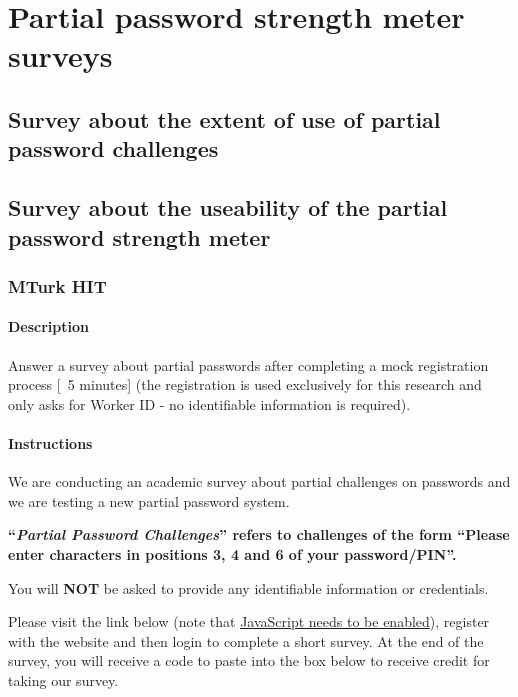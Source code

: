 
\chapter{Partial password strength meter surveys}
  \label{ap:Surveys}
  \section{Survey about the extent of use of partial password challenges}
    \label{aps:survey_extent}
    

  \section{Survey about the useability of the partial password strength meter}
    \label{aps:survey_useability}

    \subsection{MTurk HIT}
      \label{apss:useability_hit}

      \subsubsection{Description}
        \label{apsss:useability_hit_descr}
        Answer a survey about partial passwords after completing a mock registration process [~5 minutes] (the registration is used exclusively for this research and only asks for Worker ID - no identifiable information is required).

      \subsubsection{Instructions}
        \label{apsss:useability_hit_instr}
        We are conducting an academic survey about partial challenges on passwords and we are testing a new partial password system.

        \textbf{``\emph{Partial Password Challenges}'' refers to challenges of the form ``Please enter characters in positions 3, 4 and 6 of your password/PIN''.}

        You will \textbf{NOT} be asked to provide any identifiable information or credentials.

        Please visit the link below (note that \underline{JavaScript needs to be enabled}), register with the website and then login to complete a short survey. At the end of the survey, you will receive a code to paste into the box below to receive credit for taking our survey.

